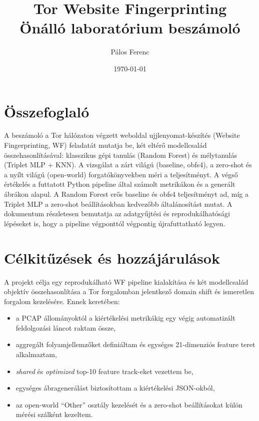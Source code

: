 \documentclass[a4paper,12pt]{article}
\title{\textbf{Tor Website Fingerprinting\\Önálló laboratórium beszámoló}}
\author{Pálos Ferenc}
\date{\today}
\begin{document}
\maketitle

\section*{Összefoglaló}
A beszámoló a Tor hálózaton végzett weboldal ujjlenyomat-készítés (Website Fingerprinting, WF)
feladatát mutatja be, két eltérő modellcsalád összehasonlításával: klasszikus gépi tanulás
(Random Forest) és mélytanulás (Triplet MLP + KNN). A vizsgálat a zárt világú
(baseline, obfs4), a zero-shot és a nyílt világú (open-world) forgatókönyvekben méri a
teljesítményt. A végső értékelés a futtatott Python pipeline által számolt metrikákon és a
generált ábrákon alapul. A Random Forest erős baseline és obfs4 teljesítményt ad, míg a
Triplet MLP a zero-shot beállításokban kedvezőbb általánosítást mutat. A dokumentum
részletesen bemutatja az adatgyűjtési és reprodukálhatósági lépéseket is, hogy a
pipeline végponttól végpontig újrafuttatható legyen.

\section{Célkitűzések és hozzájárulások}
A projekt célja egy reprodukálható WF pipeline kialakítása és két modellcsalád objektív
összehasonlítása a Tor forgalomban jelentkező domain shift és ismeretlen forgalom kezelésére.
Ennek keretében:
\begin{itemize}
    \item a PCAP állományoktól a kiértékelési metrikákig egy végig automatizált feldolgozási láncot raktam össze,
    \item aggregált folyamjellemzőket definiáltam és egységes 21-dimenziós feature teret alkalmaztam,
    \item \textit{shared} és \textit{optimized} top-10 feature track-eket vezettem be,
    \item egységes ábragenerálást biztosítottam a kiértékelési JSON-okból,
    \item az open-world ``Other'' osztály kezelését és a zero-shot beállításokat külön mérési szálként kezeltem.
\end{itemize}
\end{document}
